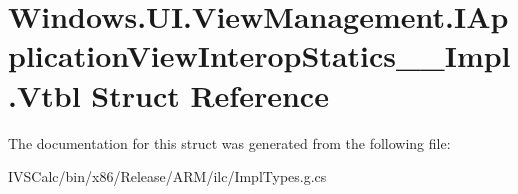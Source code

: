 \hypertarget{struct_windows_1_1_u_i_1_1_view_management_1_1_i_application_view_interop_statics_____impl_1_1_vtbl}{}\section{Windows.\+U\+I.\+View\+Management.\+I\+Application\+View\+Interop\+Statics\+\_\+\+\_\+\+Impl.\+Vtbl Struct Reference}
\label{struct_windows_1_1_u_i_1_1_view_management_1_1_i_application_view_interop_statics_____impl_1_1_vtbl}


The documentation for this struct was generated from the following file\+:\begin{DoxyCompactItemize}
\item 
I\+V\+S\+Calc/bin/x86/\+Release/\+A\+R\+M/ilc/Impl\+Types.\+g.\+cs\end{DoxyCompactItemize}
